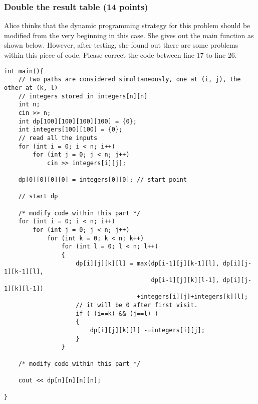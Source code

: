 \documentclass[11pt]{exam}
\begin{document}
\subsubsection{Double the result table (14 points)}
Alice thinks that the dynamic programming strategy for this problem should be modified from the very beginning in this case. She gives out the main function as shown below. However, after testing, she found out there are some problems within this piece of code. Please correct the code between line 17 to line 26.
\newpage
\begin{lstlisting}
int main(){
    // two paths are considered simultaneously, one at (i, j), the other at (k, l)
    // integers stored in integers[n][n]
    int n;
    cin >> n;
    int dp[100][100][100][100] = {0};
    int integers[100][100] = {0};
    // read all the inputs
    for (int i = 0; i < n; i++)
        for (int j = 0; j < n; j++)
            cin >> integers[i][j];
    
    dp[0][0][0][0] = integers[0][0]; // start point
    
    // start dp
    
    /* modify code within this part */
    for (int i = 0; i < n; i++)
        for (int j = 0; j < n; j++)
            for (int k = 0; k < n; k++)
                for (int l = 0; l < n; l++)
                {
                    dp[i][j][k][l] = max(dp[i-1][j][k-1][l], dp[i][j-1][k-1][l],
                                         dp[i-1][j][k][l-1], dp[i][j-1][k][l-1])
                                     +integers[i][j]+integers[k][l];
                    // it will be 0 after first visit.
                    if ( (i==k) && (j==l) ) 
                    {
                        dp[i][j][k][l] -=integers[i][j]; 
                    }
                }                        
                                         
    /* modify code within this part */
    
    cout << dp[n][n][n][n];
    
}
\end{lstlisting}
\end{document}
